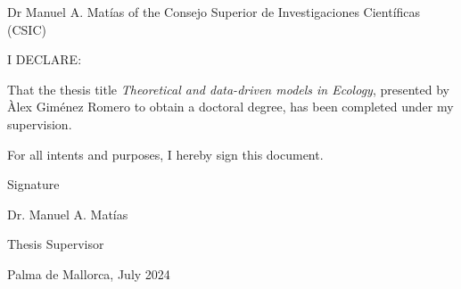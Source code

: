 \thispagestyle{empty}

Dr Manuel A. Matías of the Consejo Superior de Investigaciones
Cient\'ificas (CSIC)

\vspace*{2 cm}

I DECLARE:

\vspace*{1 cm}

That the thesis title \textit{Theoretical and data-driven models in Ecology},
presented by Àlex Giménez Romero to obtain a doctoral degree, has been
completed under my supervision.

\vspace*{2 cm}

For all intents and purposes, I hereby sign this document.

\vspace*{2 cm}

Signature

\vspace*{3 cm}

Dr. Manuel A. Matías

\vspace*{0.1 cm}

Thesis Supervisor

\vspace*{1 cm}

Palma de Mallorca, July 2024

\vfill
